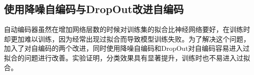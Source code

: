 \documentclass{exam}
\begin{document}
\subsection{使用降噪自编码与DropOut改进自编码}
自动编码器虽然在增加网络层数的时候对训练集的拟合比神经网络要好，在训练时却更加难以训练，因为经常出现过拟合而导致模型训练失败。为了解决这个问题，加入了对自编码的两个改进，同时使用降噪自编码和DropOut对自编码容易进入过拟合的问题进行改善。实验证明，分类效果具有显著提升，训练时也不易进入过拟合。
\end{document}
